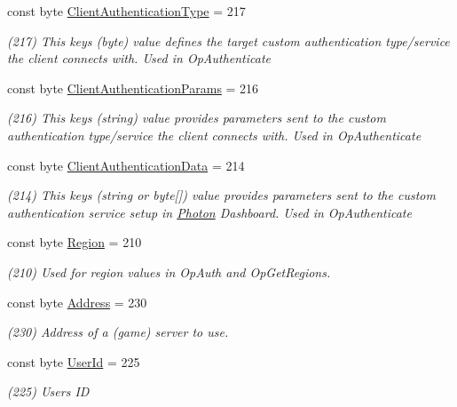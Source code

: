 \begin{DoxyCompactItemize}
\item 
const byte \hyperlink{class_exit_games_1_1_client_1_1_photon_1_1_chat_1_1_parameter_code_a244b3fc5ac2e8b3a97428b6534ca9da6}{Client\+Authentication\+Type} = 217
\begin{DoxyCompactList}\small\item\em (217) This key\textquotesingle{}s (byte) value defines the target custom authentication type/service the client connects with. Used in Op\+Authenticate\end{DoxyCompactList}\item 
const byte \hyperlink{class_exit_games_1_1_client_1_1_photon_1_1_chat_1_1_parameter_code_a70f578a01789db64e2aefa055fba1732}{Client\+Authentication\+Params} = 216
\begin{DoxyCompactList}\small\item\em (216) This key\textquotesingle{}s (string) value provides parameters sent to the custom authentication type/service the client connects with. Used in Op\+Authenticate\end{DoxyCompactList}\item 
const byte \hyperlink{class_exit_games_1_1_client_1_1_photon_1_1_chat_1_1_parameter_code_a188165801d2b627e28b1476353e103ad}{Client\+Authentication\+Data} = 214
\begin{DoxyCompactList}\small\item\em (214) This key\textquotesingle{}s (string or byte\mbox{[}\mbox{]}) value provides parameters sent to the custom authentication service setup in \hyperlink{namespace_exit_games_1_1_client_1_1_photon}{Photon} Dashboard. Used in Op\+Authenticate\end{DoxyCompactList}\item 
const byte \hyperlink{class_exit_games_1_1_client_1_1_photon_1_1_chat_1_1_parameter_code_a858cbc8aac0919b92ab761e92decf1da}{Region} = 210
\begin{DoxyCompactList}\small\item\em (210) Used for region values in Op\+Auth and Op\+Get\+Regions.\end{DoxyCompactList}\item 
const byte \hyperlink{class_exit_games_1_1_client_1_1_photon_1_1_chat_1_1_parameter_code_a7fa2bc4b15e962459df490987acb4745}{Address} = 230
\begin{DoxyCompactList}\small\item\em (230) Address of a (game) server to use.\end{DoxyCompactList}\item 
const byte \hyperlink{class_exit_games_1_1_client_1_1_photon_1_1_chat_1_1_parameter_code_a2b1f96b419566ad8b1bfc78caf261f76}{User\+Id} = 225
\begin{DoxyCompactList}\small\item\em (225) User\textquotesingle{}s ID\end{DoxyCompactList}\end{DoxyCompactItemize}


